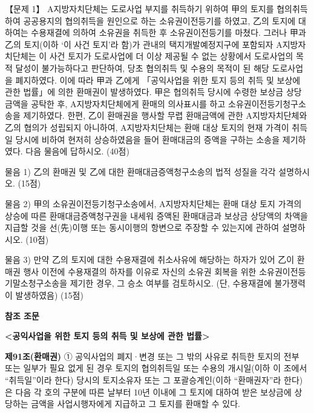 \begin{longquestion}{【문제 1】}
A지방자치단체는 도로사업 부지를 취득하기 위하여 甲의 토지를 협의취득하여 공공용지의 협의취득을 원인으로 하는 소유권이전등기를 하였고, 乙의 토지에 대하여는 수용재결에 의하여 소유권을 취득한 후 소유권이전등기를 마쳤다. 그러나 甲과 乙의 토지(이하 ‘이 사건 토지’라 함)가 관내의 택지개발예정지구에 포함되자 A지방자치단체는 이 사건 토지가 도로사업에 더 이상 제공될 수 없는 상황에서 도로사업의 목적 달성이 불가능하다고 판단하여, 당초 협의취득 및 수용의 목적이 된 해당 도로사업을 폐지하였다. 이에 따라 甲과 乙에게 「공익사업을 위한 토지 등의 취득 및 보상에 관한 법률」에 의한 환매권이 발생하였다. 甲은 협의취득 당시에 수령한 보상금 상당 금액을 공탁한 후, A지방자치단체에게 환매의 의사표시를 하고 소유권이전등기청구소송을 제기하였다. 한편, 乙이 환매권을 행사할 무렵 환매금액에 관한 A지방자치단체와 乙의 협의가 성립되지 아니하여, A지방자치단체는 환매 대상 토지의 현재 가격이 취득일 당시에 비하여 현저히 상승하였음을 들어 환매대금의 증액을 구하는 소송을 제기하였다. 다음 물음에 답하시오. (40점) \par
\medskip\noindent 물음 1) 乙의 환매권 및 乙에 대한 환매대금증액청구소송의 법적 성질을 각각 설명하시오. (15점) \par
\medskip\noindent 물음 2) 甲의 소유권이전등기청구소송에서, A지방자치단체는 환매 대상 토지 가격의 상승에 따른 환매대금증액청구권을 내세워 증액된 환매대금과 보상금 상당액의 차액을 지급할 것을 선(先)이행 또는 동시이행의 항변으로 주장할 수 있는지에 관하여 설명하시오. (10점) \par
\medskip\noindent 물음 3) 만약 乙의 토지에 대한 수용재결에 취소사유에 해당하는 하자가 있어 乙이 환매권 행사 이전에 수용재결의 하자를 이유로 자신의 소유권 회복을 위한 소유권이전등기말소청구소송을 제기한 경우, 그 승소 여부를 검토하시오. (단, 수용재결에 불가쟁력이 발생하였음) (15점) \par
\medskip
\begin{framedtext}
\textbf{참조 조문} \par
\textbf{<공익사업을 위한 토지 등의 취득 및 보상에 관한 법률>} \par
\textbf{제91조(환매권)} ① 공익사업의 폐지·변경 또는 그 밖의 사유로 취득한 토지의 전부 또는 일부가 필요 없게 된 경우 토지의 협의취득일 또는 수용의 개시일(이하 이 조에서 “취득일”이라 한다) 당시의 토지소유자 또는 그 포괄승계인(이하 “환매권자”라 한다)은 다음 각 호의 구분에 따른 날부터 10년 이내에 그 토지에 대하여 받은 보상금에 상당하는 금액을 사업시행자에게 지급하고 그 토지를 환매할 수 있다. \par

\end{framedtext}
\end{longquestion}
